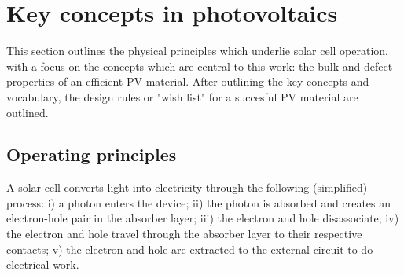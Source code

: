 
\section{Key concepts in photovoltaics}

This section outlines the physical principles which underlie solar cell operation, with a focus on the concepts which are central to this work: the bulk and defect properties of an efficient PV material. After outlining the key concepts and vocabulary, the design rules or "wish list" for a succesful PV material are outlined. 

\subsection{Operating principles} \label{operatingprinciples}


A solar cell converts light into electricity through the following (simplified) process: i) a photon enters the device; ii) the photon is absorbed and creates an electron-hole pair in the absorber layer; iii) the electron and hole disassociate; iv) the electron and hole travel through the absorber layer to their respective contacts; v) the electron and hole are extracted to the external circuit to do electrical work.


